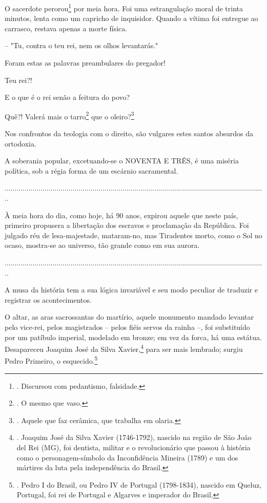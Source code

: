 O sacerdote perorou\footnote{. Discursou com pedantismo, falsidade.} por
meia hora. Foi uma estrangulação moral de trinta minutos, lenta como um
capricho de inquisidor. Quando a vítima foi entregue ao carrasco,
restava apenas a morte física.

-- "Tu, contra o teu rei, nem os olhos levantarás."

Foram estas as palavras preambulares do pregador!

Teu rei?!

E o que é o rei senão a feitura do povo?

Quê?! Valerá mais o tarro\footnote{. O mesmo que vaso.} que o
oleiro?\footnote{. Aquele que faz cerâmica, que trabalha em olaria.}

Nos confrontos da teologia com o direito, são vulgares estes santos
absurdos da ortodoxia.

A soberania popular, excetuando-se o NOVENTA E TRÊS, é uma miséria
política, sob a régia forma de um escárnio sacramental.

...................................................................................................................................

À meia hora do dia, como hoje, há 90 anos, expirou aquele que neste
país, primeiro propusera a libertação dos escravos e proclamação da
República. Foi julgado réu de lesa-majestade, mataram-no, mas Tiradentes
morto, como o Sol no ocaso, mostra-se ao universo, tão grande como em
sua aurora.

...................................................................................................................................

A musa da história tem a sua lógica invariável e seu modo peculiar de
traduzir e registrar os acontecimentos.

O altar, as aras sacrossantas do martírio, aquele monumento mandado
levantar pelo vice-rei, pelos magistrados -- pelos fiéis servos da
rainha --, foi substituído por um patíbulo imperial, modelado em bronze;
em vez da forca, há uma estátua. Desapareceu Joaquim José da Silva
Xavier,\footnote{. Joaquim José da Silva Xavier (1746-1792), nascido na
  região de São João del Rei (MG), foi dentista, militar e o
  revolucionário que passou à história como o personagem-símbolo da
  Inconfidência Mineira (1789) e um dos mártires da luta pela
  independência do Brasil.} para ser mais lembrado; surgiu Pedro
Primeiro, o esquecido.\footnote{. Pedro I do Brasil, ou Pedro IV de
  Portugal (1798-1834), nascido em Queluz, Portugal, foi rei de Portugal
  e Algarves e imperador do Brasil.}

